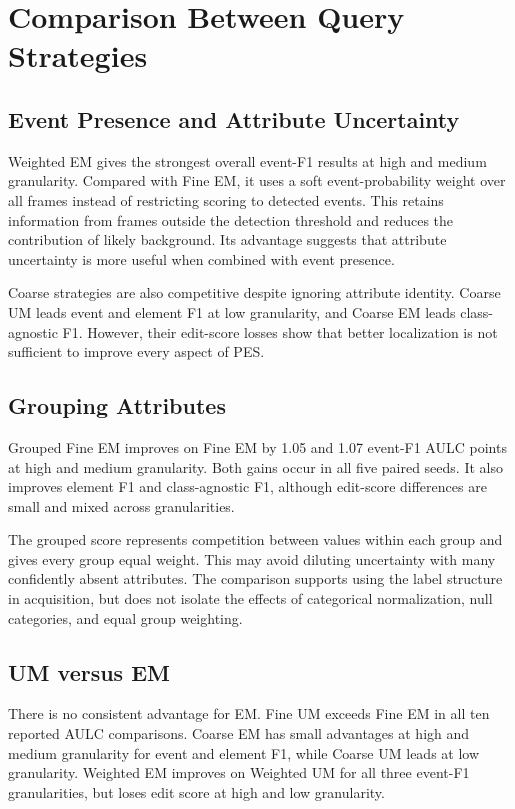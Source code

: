 \section{Comparison Between Query Strategies}
\label{sec:Comparison Between Query Strategies}

\subsection{Event Presence and Attribute Uncertainty}
Weighted EM gives the strongest overall event-F1 results at high and medium granularity. Compared with Fine EM, it uses a soft event-probability weight over all frames instead of restricting scoring to detected events. This retains information from frames outside the detection threshold and reduces the contribution of likely background. Its advantage suggests that attribute uncertainty is more useful when combined with event presence.

Coarse strategies are also competitive despite ignoring attribute identity. Coarse UM leads event and element F1 at low granularity, and Coarse EM leads class-agnostic F1. However, their edit-score losses show that better localization is not sufficient to improve every aspect of PES.

\subsection{Grouping Attributes}
Grouped Fine EM improves on Fine EM by 1.05 and 1.07 event-F1 AULC points at high and medium granularity. Both gains occur in all five paired seeds. It also improves element F1 and class-agnostic F1, although edit-score differences are small and mixed across granularities.

The grouped score represents competition between values within each group and gives every group equal weight. This may avoid diluting uncertainty with many confidently absent attributes. The comparison supports using the label structure in acquisition, but does not isolate the effects of categorical normalization, null categories, and equal group weighting.

\subsection{UM versus EM}
There is no consistent advantage for EM. Fine UM exceeds Fine EM in all ten reported AULC comparisons. Coarse EM has small advantages at high and medium granularity for event and element F1, while Coarse UM leads at low granularity. Weighted EM improves on Weighted UM for all three event-F1 granularities, but loses edit score at high and low granularity.

